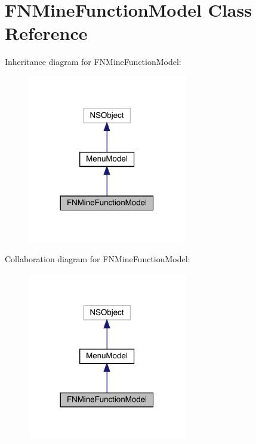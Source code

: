 \hypertarget{interface_f_n_mine_function_model}{}\section{F\+N\+Mine\+Function\+Model Class Reference}
\label{interface_f_n_mine_function_model}


Inheritance diagram for F\+N\+Mine\+Function\+Model\+:\nopagebreak
\begin{figure}[H]
\begin{center}
\leavevmode
\includegraphics[width=197pt]{interface_f_n_mine_function_model__inherit__graph}
\end{center}
\end{figure}


Collaboration diagram for F\+N\+Mine\+Function\+Model\+:\nopagebreak
\begin{figure}[H]
\begin{center}
\leavevmode
\includegraphics[width=197pt]{interface_f_n_mine_function_model__coll__graph}
\end{center}
\end{figure}
